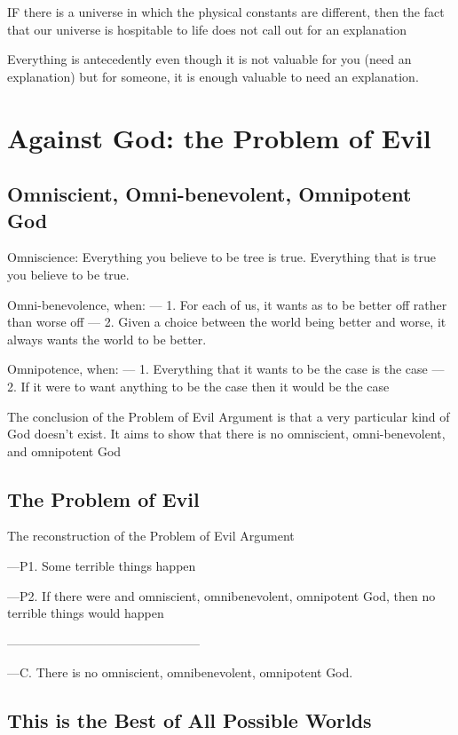 \documentclass{book}
\begin{document}
IF there is a universe in which the physical constants are different, then the fact that our universe is hospitable to life does not call out for an explanation

Everything is antecedently even though it is not valuable for you (need an explanation) but for someone, it is enough valuable to need an explanation.

\section{Against God: the Problem of Evil}

\subsection{Omniscient, Omni-benevolent, Omnipotent God}

Omniscience: Everything you believe to be tree is true. Everything that is true you believe to be true.

Omni-benevolence, when:
--- 1. For each of us, it wants as to be better off rather than worse off
--- 2. Given a choice between the world being better and worse, it always wants the world to be better.

Omnipotence, when:
--- 1. Everything that it wants to be the case is the case
--- 2. If it were to want anything to be the case then it would be the case

The conclusion of the Problem of Evil Argument is that a very particular kind of God doesn't exist. It aims to show that there is no omniscient, omni-benevolent, and omnipotent God


\subsection{The Problem of Evil}
 
The reconstruction of the Problem of Evil Argument

---P1. Some terrible things happen

---P2. If there were and omniscient, omnibenevolent, omnipotent God, then no terrible things would happen

-----------------------------------------------

---C. There is no omniscient, omnibenevolent, omnipotent God.



\subsection{This is the Best of All Possible Worlds}
\end{document}
